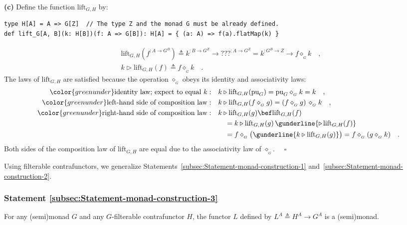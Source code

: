 \textbf{(c)} Define the function $\text{lift}_{G,H}$ by:
\begin{lstlisting}
type H[A] = A => G[Z]  // The type Z and the monad G must be already defined.
def lift_G[A, B](k: H[B])(f: A => G[B]): H[A] = { (a: A) => f(a).flatMap(k) }
\end{lstlisting}
\begin{align*}
 & \text{lift}_{G,H}(f^{:A\rightarrow G^{B}})\triangleq k^{:B\rightarrow G^{Z}}\rightarrow\text{???}^{:A\rightarrow G^{Z}}=k^{:G^{B}\rightarrow Z}\rightarrow f\diamond_{_{G}}k\quad,\\
 & k\triangleright\text{lift}_{G,H}(f)\triangleq f\diamond_{_{G}}k\quad.
\end{align*}
The laws of $\text{lift}_{G,H}$ are satisfied because the operation
$\diamond_{_{G}}$ obeys its identity and associativity laws:
\begin{align*}
{\color{greenunder}\text{identity law; expect to equal }k:}\quad & k\triangleright\text{lift}_{G,H}(\text{pu}_{G})=\text{pu}_{G}\diamond_{_{G}}k=k\quad,\\
{\color{greenunder}\text{left-hand side of composition law}:}\quad & k\triangleright\text{lift}_{G,H}(f\diamond_{_{G}}g)=(f\diamond_{_{G}}g)\,\diamond_{_{G}}k\quad,\\
{\color{greenunder}\text{right-hand side of composition law}:}\quad & k\triangleright\text{lift}_{G,H}(g)\bef\text{lift}_{G,H}(f)\\
 & \quad=k\triangleright\text{lift}_{G,H}(g)\,\gunderline{\triangleright\,\text{lift}_{G,H}(f)}\\
 & \quad=f\diamond_{_{G}}\big(\gunderline{k\triangleright\text{lift}_{G,H}(g)}\big)=f\diamond_{_{G}}(g\diamond_{_{G}}k)\quad.
\end{align*}
Both sides of the composition law of $\text{lift}_{G,H}$ are equal
due to the associativity law of $\diamond_{_{G}}$. $\quad$$\square$

Using filterable contrafunctors, we generalize Statements~\ref{subsec:Statement-monad-construction-1}
and~\ref{subsec:Statement-monad-construction-2}.

\subsubsection{Statement \label{subsec:Statement-monad-construction-3}\ref{subsec:Statement-monad-construction-3}}

For any (semi)monad $G$ and any $G$-filterable contrafunctor $H$,
the functor $L$ defined by $L^{A}\triangleq H^{A}\rightarrow G^{A}$
is a (semi)monad.

